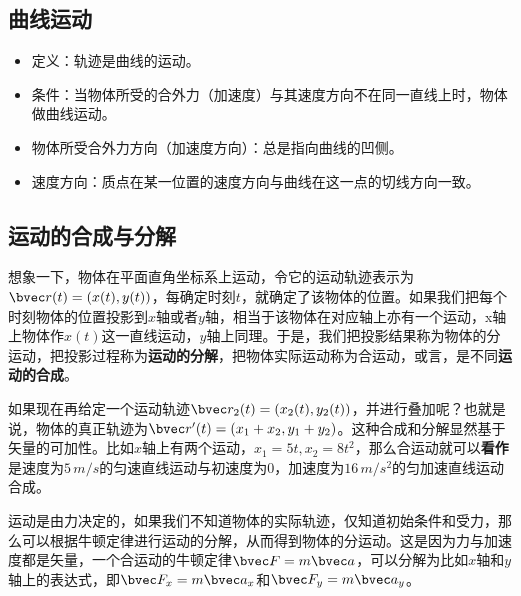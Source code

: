 

\subsection{曲线运动}

\begin{itemize}
\item 定义：轨迹是曲线的运动。
\item 条件：当物体所受的合外力（加速度）与其速度方向不在同一直线上时，物体做曲线运动。
\item 物体所受合外力方向（加速度方向）：总是指向曲线的凹侧。
\item 速度方向：质点在某一位置的速度方向与曲线在这一点的切线方向一致。
\end{itemize}

\subsection{运动的合成与分解}
想象一下，物体在平面直角坐标系上运动，令它的运动轨迹表示为$\bvec r(t)=(x(t),y(t))$，每确定时刻$t$，就确定了该物体的位置。如果我们把每个时刻物体的位置投影到$x$轴或者$y$轴，相当于该物体在对应轴上亦有一个运动，x轴上物体作$x(t)$这一直线运动，$y$轴上同理。于是，我们把投影结果称为物体的分运动，把投影过程称为\textbf{运动的分解}，把物体实际运动称为合运动，或言，是不同\textbf{运动的合成}。

如果现在再给定一个运动轨迹$\bvec r_2(t)=(x_2(t),y_2(t))$，并进行叠加呢？也就是说，物体的真正轨迹为$\bvec r'(t)=(x_1+x_2,y_1+y_2)$。这种合成和分解显然基于矢量的可加性。比如$x$轴上有两个运动，$x_1=5t,x_2=8t^2$，那么合运动就可以\textbf{看作}是速度为$5\,m/s$的匀速直线运动与初速度为$0$，加速度为$16\,m/s^2$的匀加速直线运动合成。

运动是由力决定的，如果我们不知道物体的实际轨迹，仅知道初始条件和受力，那么可以根据牛顿定律进行运动的分解，从而得到物体的分运动。这是因为力与加速度都是矢量，一个合运动的牛顿定律$\bvec F=m\bvec a$，可以分解为比如$x$轴和$y$轴上的表达式，即$\bvec F_x=m\bvec a_x$和$\bvec F_y=m\bvec a_y$。

